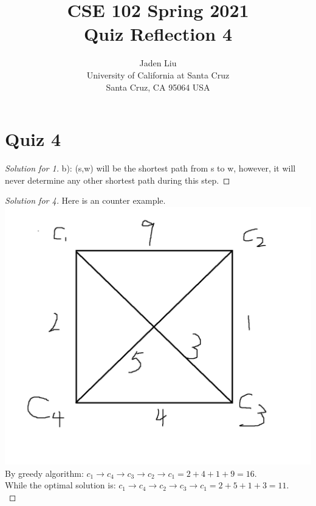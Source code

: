 \documentclass[12pt]{article}
\begin{document}
\title{ CSE 102 Spring 2021\\
	Quiz Reflection 4}

\author{Jaden Liu \\ 
University of California at Santa Cruz\\
Santa Cruz, CA 95064 USA }

\maketitle


\section{Quiz 4} 

\begin{proof}[Solution for 1]
	b): (s,w) will be the shortest path from s to w, however, it will never determine any other shortest path during this step.
\end{proof}
\begin{proof}[Solution for 4]
	Here is an counter example.\\
	\includegraphics[scale=0.25]{4.png}\\
	By greedy algorithm: $c_1\rightarrow c_4\rightarrow c_3 \rightarrow c_2 \rightarrow c_1 =2+4+1+9=16$.\\
	While the optimal solution is: $c_1\rightarrow c_4\rightarrow c_2 \rightarrow c_3\rightarrow c_1=2+5+1+3=11$.\\
\end{proof}
\end{document}
